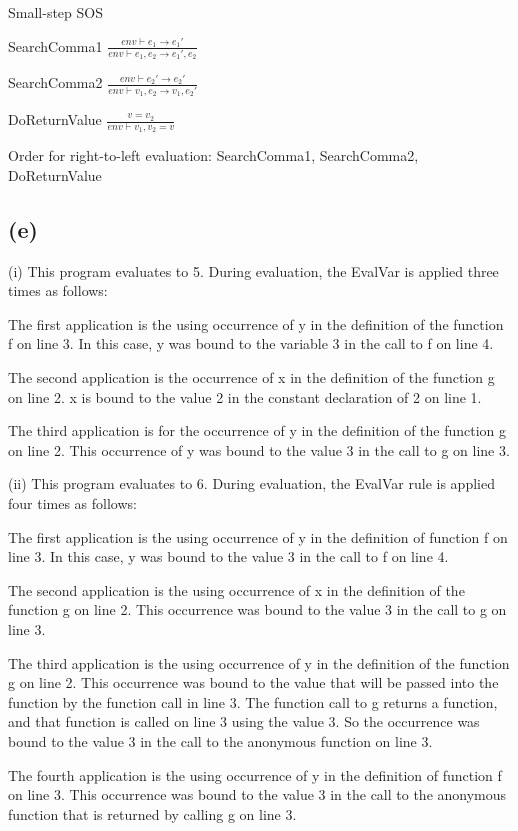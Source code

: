 \documentclass[11pt, oneside]{article}
\newcommand{\forceindent}{\leavevmode{\parindent=1.5em\indent}}
\begin{document}
\par Small-step SOS
\par SearchComma1
$
\frac{
	env \vdash e_1 \rightarrow e_1'
}
{
	env \vdash e_1, e_2 \rightarrow e_1', e_2
}
$
\par SearchComma2
$
\frac{
	env \vdash e_2' \rightarrow e_2'
}
{
	env \vdash v_1, e_2 \rightarrow v_1, e_2'
}
$
\par DoReturnValue
$
\frac{
	v = v_2
}
{
	env \vdash v_1, v_2 = v
}
$
\par Order for right-to-left evaluation: SearchComma1, SearchComma2, DoReturnValue

\subsection*{(e)}
\forceindent \par (i) This program evaluates to 5. During evaluation, the EvalVar is applied three times as follows:
\par The first application is the using occurrence of y in the definition of the function f on line 3. In this case, y was bound to the variable 3 in the call to f on line 4. 
\par The second application is the occurrence of x in the definition of the function g on line 2. x is bound to the value 2 in the constant declaration of 2 on line 1.
\par The third application is for the occurrence of y in the definition of the function g on line 2. This occurrence of y was bound to the value 3 in the call to g on line 3.

\par (ii) This program evaluates to 6. During evaluation, the EvalVar rule is applied four times as follows:
\par The first application is the using occurrence of y in the definition of function f on line 3. In this case, y was bound to the value 3 in the call to f on line 4.
\par The second application is the using occurrence of x in the definition of the function g on line 2. This occurrence was bound to the value 3 in the call to g on line 3.
\par The third application is the using occurrence of y in the definition of the function g on line 2. This occurrence was bound to the value that will be passed into the function by the function call in line 3. The function call to g returns a function, and that function is called on line 3 using the value 3. So the occurrence was bound to the value 3 in the call to the anonymous function on line 3.
\par The fourth application is the using occurrence of y in the definition of function f on line 3. This occurrence was bound to the value 3 in the call to the anonymous function that is returned by calling g on line 3. 
\end{document}
